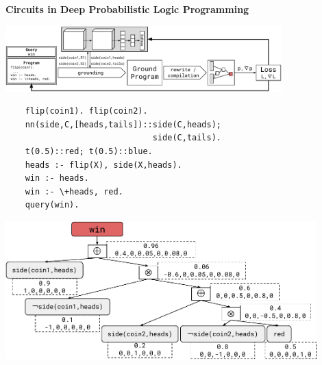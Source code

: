 \documentclass[aspectratio=169]{beamer}
\newcommand{\ccimg}{%
  \hspace{0.25cm}\def\svgwidth{0.1\textwidth}%
}
\begin{document}
\begin{frame}[fragile]{\textbf{Circuits in Deep Probabilistic Logic Programming}}

\begin{center}
  \includegraphics[width=0.8\textwidth]{figures/deepproblog-diagram.pdf}

  \vspace{0.5cm}

  \begin{minipage}{0.5\textwidth}
    \centering
    \begin{verbatim}
    flip(coin1). flip(coin2).
    nn(side,C,[heads,tails])::side(C,heads);
                              side(C,tails).
    t(0.5)::red; t(0.5)::blue.
    heads :- flip(X), side(X,heads).
    win :- heads.
    win :- \+heads, red.
    query(win).
    \end{verbatim}
  \end{minipage}%
  \begin{minipage}{0.5\textwidth}
    \centering
    \includegraphics[width=0.9\textwidth]{figures/deepproblog-sdd.pdf}
  \end{minipage}
\end{center}

\vfill

\textcolor{dark gray}{\scriptsize\citep{manhaeve21}}

\end{frame}




\begin{frame}
    \titlepage
    \ccimg
\end{frame}


\end{document}
